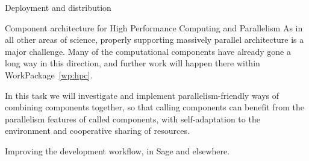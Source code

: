 \begin{Workpackage}{\thewpno}
  \begin{task}{Deployment and distribution}
  \end{task}

  \begin{task}{Component architecture for High Performance Computing and Parallelism}
    As in all other areas of science, properly supporting massively
    parallel architecture is a major challenge. Many of the
    computational components have already gone a long way in this
    direction, and further work will happen there within
    WorkPackage~\ref{wp:hpc}.

    In this task we will investigate and implement
    parallelism-friendly ways of combining components together, so
    that calling components can benefit from the parallelism features
    of called components, with self-adaptation to the environment and
    cooperative sharing of resources.
  \end{task}

  \begin{task}{Improving the development workflow, in Sage and elsewhere.}
    \TODO{}
  \end{task}

  \begin{WPDeliverables}



\end{WPDeliverables}
\end{Workpackage}
